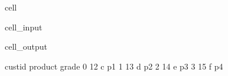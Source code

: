 \documentclass[letterpaper,10pt,english]{jupyterBook}
\begin{document}
\begin{sphinxuseclass}{cell}\begin{sphinxVerbatimInput}

\begin{sphinxuseclass}{cell_input}
\begin{sphinxVerbatim}[commandchars=\\\{\}]
   
\end{sphinxVerbatim}

\end{sphinxuseclass}\end{sphinxVerbatimInput}
\begin{sphinxVerbatimOutput}

\begin{sphinxuseclass}{cell_output}
\begin{sphinxVerbatim}[commandchars=\\\{\}]
   cust\PYGZus{}id product grade
0       12       c    p1
1       13       d    p2
2       14       e    p3
3       15       f    p4
\end{sphinxVerbatim}

\end{sphinxuseclass}\end{sphinxVerbatimOutput}

\end{sphinxuseclass}






\renewcommand{\indexname}{Index}
\printindex
\end{document}
